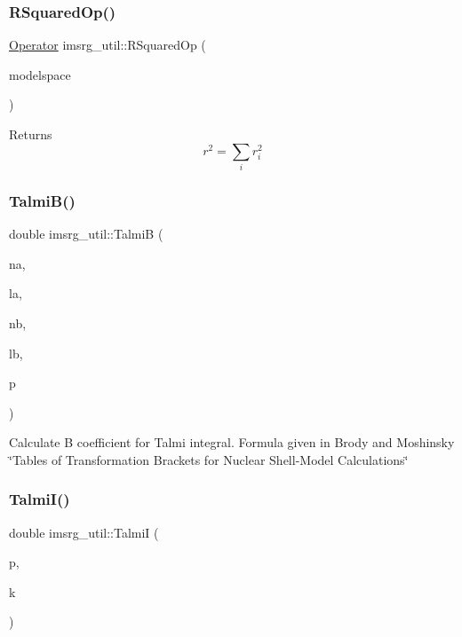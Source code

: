 \subsubsection{\texorpdfstring{R\+Squared\+Op()}{RSquaredOp()}}
{\footnotesize\ttfamily \hyperlink{classOperator}{Operator} imsrg\+\_\+util\+::\+R\+Squared\+Op (\begin{DoxyParamCaption}\item[{\hyperlink{classModelSpace}{Model\+Space} \&}]{modelspace }\end{DoxyParamCaption})}

Returns \[ r^2 = \sum_{i} r_{i}^2 \] \mbox{\label{namespaceimsrg__util_a817428b9475c73e39f5db8173de9c182}} 
\subsubsection{\texorpdfstring{Talmi\+B()}{TalmiB()}}
{\footnotesize\ttfamily double imsrg\+\_\+util\+::\+TalmiB (\begin{DoxyParamCaption}\item[{int}]{na,  }\item[{int}]{la,  }\item[{int}]{nb,  }\item[{int}]{lb,  }\item[{int}]{p }\end{DoxyParamCaption})}

Calculate B coefficient for Talmi integral. Formula given in Brody and Moshinsky \char`\"{}\+Tables of Transformation Brackets for Nuclear Shell-\/\+Model Calculations\char`\"{} \mbox{\label{namespaceimsrg__util_abbae76adb7379aa8c1b9f95a74514aef}} 
\subsubsection{\texorpdfstring{Talmi\+I()}{TalmiI()}}
{\footnotesize\ttfamily double imsrg\+\_\+util\+::\+TalmiI (\begin{DoxyParamCaption}\item[{int}]{p,  }\item[{double}]{k }\end{DoxyParamCaption})}

